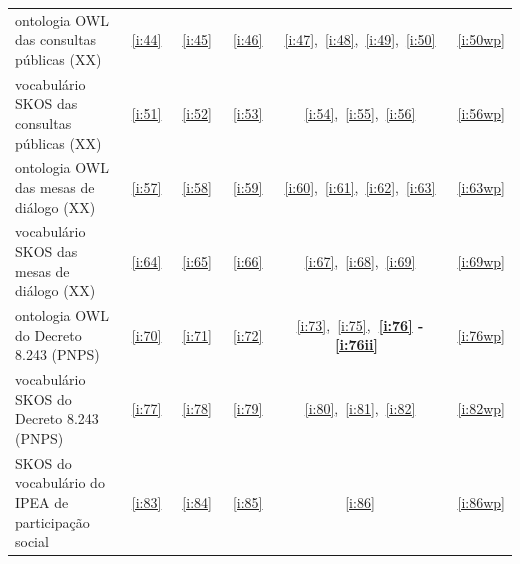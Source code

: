 \documentclass[12pt]{article}
\begin{document}
\begin{table}[htpq!]
\begin{tabular}{| p{6cm} | c | c | c | c | c | }
ontologia   OWL  das consultas públicas (XX) &~\ref{i:44}&~\ref{i:45}&~\ref{i:46}&~\ref{i:47},~\ref{i:48},~\ref{i:49},~\ref{i:50}&~\ref{i:50wp} \\
vocabulário SKOS das consultas públicas (XX) &~\ref{i:51}&~\ref{i:52}&~\ref{i:53}&~\ref{i:54},~\ref{i:55},~\ref{i:56}&~\ref{i:56wp} \\\hline\hline

ontologia   OWL  das mesas de diálogo (XX) &~\ref{i:57}&~\ref{i:58}&~\ref{i:59}&~\ref{i:60},~\ref{i:61},~\ref{i:62},~\ref{i:63}&~\ref{i:63wp} \\
vocabulário SKOS das mesas de diálogo (XX) &~\ref{i:64}&~\ref{i:65}&~\ref{i:66}&~\ref{i:67},~\ref{i:68},~\ref{i:69}&~\ref{i:69wp} \\\hline\hline

ontologia   OWL  do Decreto 8.243 (PNPS) &~\ref{i:70}&~\ref{i:71}&~\ref{i:72}&~\ref{i:73},~\ref{i:75},{\bf ~\ref{i:76} - \ref{i:76ii} }&~\ref{i:76wp} \\
vocabulário SKOS do Decreto 8.243 (PNPS) &~\ref{i:77}&~\ref{i:78}&~\ref{i:79}&~\ref{i:80},~\ref{i:81},~\ref{i:82}&~\ref{i:82wp} \\\hline\hline

SKOS do vocabulário do IPEA de participação social &~\ref{i:83}&~\ref{i:84}&~\ref{i:85}&~\ref{i:86}&~\ref{i:86wp} \\\hline\hline
\end{tabular}\label{tab:ovbs}
\end{table}
\end{document}

